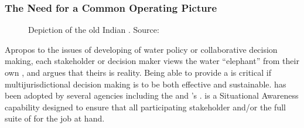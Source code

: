 \documentclass[letterpaper,12pt,english]{book}
\let\sphinxpxdimen\pdfpxdimen\else\newdimen\sphinxpxdimen
\begin{document}
\subsubsection{The Need for a Common Operating Picture}
\label{\detokenize{requirements/introduction/cop:the-need-for-a-common-operating-picture}}\label{\detokenize{requirements/introduction/cop::doc}}
\begin{figure}[htbp]
\centering
\capstart

\noindent\sphinxincludegraphics[height=500\sphinxpxdimen]{{Blind_men_and_elephant4}.jpg}
\caption{Depiction of the old Indian .
Source: }\label{\detokenize{requirements/introduction/cop:id2}}\end{figure}

\sphinxAtStartPar
Apropos to the issues of developing of water policy or collaborative decision
making, each stakeholder or decision maker views the
water “elephant” from their own , and argues that
theirs is reality. Being able to provide a  is
critical if multi\sphinxhyphen{}jurisdictional decision making is to be both effective and
sustainable. {\hyperref[\detokenize{glossary:term-COP}]{}} has been adopted by several agencies including the {\hyperref[\detokenize{glossary:term-DHS}]{}} and
{\hyperref[\detokenize{glossary:term-NOAA}]{}}’s {\hyperref[\detokenize{glossary:term-NWS}]{}}. {\hyperref[\detokenize{glossary:term-COP}]{}} is a Situational Awareness capability
designed to ensure that
all participating stakeholder and/or  the full suite
of  for the job at hand.
\end{document}
